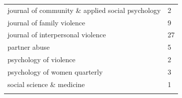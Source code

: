 \documentclass[]{tufte-handout}
\begin{document}
\begin{longtable}[]{@{}ll@{}}
\begin{minipage}[t]{0.67\columnwidth}\raggedright\strut
journal of community \& applied social psychology\strut
\end{minipage} & \begin{minipage}[t]{0.08\columnwidth}\raggedright\strut
2\strut
\end{minipage}\tabularnewline
\begin{minipage}[t]{0.67\columnwidth}\raggedright\strut
journal of family violence\strut
\end{minipage} & \begin{minipage}[t]{0.08\columnwidth}\raggedright\strut
9\strut
\end{minipage}\tabularnewline
\begin{minipage}[t]{0.67\columnwidth}\raggedright\strut
journal of interpersonal violence\strut
\end{minipage} & \begin{minipage}[t]{0.08\columnwidth}\raggedright\strut
27\strut
\end{minipage}\tabularnewline
\begin{minipage}[t]{0.67\columnwidth}\raggedright\strut
partner abuse\strut
\end{minipage} & \begin{minipage}[t]{0.08\columnwidth}\raggedright\strut
5\strut
\end{minipage}\tabularnewline
\begin{minipage}[t]{0.67\columnwidth}\raggedright\strut
psychology of violence\strut
\end{minipage} & \begin{minipage}[t]{0.08\columnwidth}\raggedright\strut
2\strut
\end{minipage}\tabularnewline
\begin{minipage}[t]{0.67\columnwidth}\raggedright\strut
psychology of women quarterly\strut
\end{minipage} & \begin{minipage}[t]{0.08\columnwidth}\raggedright\strut
3\strut
\end{minipage}\tabularnewline
\begin{minipage}[t]{0.67\columnwidth}\raggedright\strut
social science \& medicine\strut
\end{minipage} & \begin{minipage}[t]{0.08\columnwidth}\raggedright\strut
1\strut
\end{minipage}\tabularnewline
\begin{minipage}[t]{0.67\columnwidth}\raggedright\strut

\end{minipage}
\end{longtable}
\end{document}
